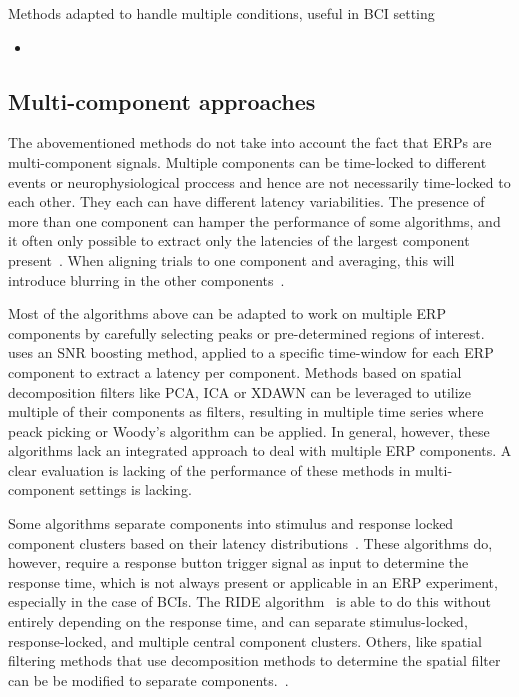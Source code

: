 Methods adapted to handle multiple conditions, useful in BCI setting
\begin{itemize}
	\item \cite{Kim2020}
\end{itemize}

\subsection{Multi-component approaches}
The abovementioned methods do not take into account the fact that  ERPs are multi-component signals. Multiple components can be time-locked to different events or neurophysiological proccess and hence are not necessarily
time-locked to each other. They each can have different latency
variabilities. The presence of more than one component can hamper the
performance of some algorithms, and it often only possible to extract only the
latencies of the largest component present~\cite{Ouyang2017}. When aligning trials
to one component and averaging, this will introduce blurring in the other
components~\cite{Ouyang2020}.

Most of the algorithms above can be adapted to work on multiple ERP components
by carefully selecting peaks or pre-determined regions of interest.
\cite{hardiansyah2020single} uses an SNR boosting method, applied to a specific
time-window for each ERP component to extract a latency per component.
Methods based on spatial decomposition filters like PCA, ICA or XDAWN can be leveraged
to utilize multiple of their components as filters, resulting in multiple time
series where peack picking or Woody's algorithm can be applied. In general,
however, these algorithms lack an integrated approach to deal with multiple
ERP components. A clear evaluation is lacking of the performance of these
methods in
multi-component settings is lacking.

Some algorithms separate components into stimulus and response locked component clusters based on their
latency distributions~\cite{jung2001analysis, Takeda2008,
	Zhang1998, Yin2009}. These algorithms do, however, require a response
button trigger signal as input to determine the response time, which is
not always present or applicable in an ERP experiment, especially in
the case of BCIs.
The RIDE algorithm~\cite{Ouyang2011, Ouyang2015,
	Wang2015, Ouyang2016, Ouyang2020} is able to do this without entirely depending on
the response time, and can separate stimulus-locked, response-locked,
and multiple central component clusters. Others, like spatial filtering methods that use
decomposition methods to determine the spatial filter can be be modified to separate
components.~\cite{Ouyang2017}.


